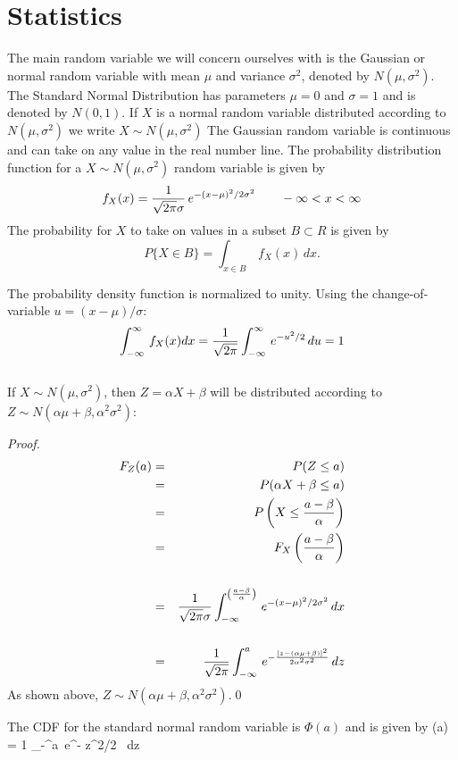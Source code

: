 \section{Statistics}

The main random variable we will concern ourselves with is the Gaussian or normal random variable with mean $\mu$ and variance $\sigma^2$, denoted by $N(\mu, \sigma^2)$. 
The Standard Normal Distribution has parameters $\mu =0$ and $\sigma = 1$ and is denoted by $N(0,1)$. If $X$ is a normal random variable distributed according to $N(\mu,\sigma^2)$ we write 
$X \sim N(\mu, \sigma^2)$
The Gaussian random variable is continuous and can take on any value in the real number line. The probability distribution function for a $X \sim N(\mu,\sigma^2)$ random variable is given by 
$$f_X(x) = {1\over \sqrt{2\pi}\sigma}\, e^{-(x-\mu)^2/2\sigma^2} \quad\quad -\infty < x < \infty$$
The probability for $X$ to take on values in a subset $B \subset R$ is given by $$P\{X \in B\} = \int_{x \in B}\, f_X(x)\, dx.$$

The probability density function is normalized to unity. Using the change-of-variable $u = (x-\mu)/\sigma$: 
\begin{equation}
\int_{-\infty}^{\infty} \, f_X(x) dx = {1\over \sqrt{2\pi}} \int_{-\infty}^{\infty}\, e^{-u^2/2}\, du = 1
\label{eqn:gaussnormalization} \end{equation}\\

If $X \sim N(\mu, \sigma^2)$, then $Z = \alpha X + \beta$ will be distributed according to $Z \sim N(\alpha\mu + \beta, \alpha^2\sigma^2)$: 
\begin{proof}
\begin{eqnarray*}\large
F_Z(a)    &=& P(Z\le a)\\
               &=& P(\alpha X + \beta \le a) \\
               &=& P\left(X \le {a - \beta\over \alpha}\right) \\
               &=& F_X\left({a - \beta\over \alpha}\right) \\ \\
               &=& {1\over \sqrt{2\pi}\sigma} \int_{-\infty}^{\left({a-\beta\over \alpha}\right)} \, e^{-(x-\mu)^2/2\sigma^2}\, dx\\ \\
               &=& {1\over \sqrt{2\pi}} \int_{-\infty}^{a}\, e^{-{ [z - (\alpha\mu + \beta) ]^2\over2\alpha^2\sigma^2} } \, dz
\end{eqnarray*}
As shown above, $Z \sim N(\alpha\mu + \beta, \alpha^2\sigma^2)$.\qed
\end{proof}

The CDF for the standard normal random variable is $\Phi(a)$ and is given by 
\be \Phi(a) = {1\over \sqrt{2\pi}} \int_{-\infty}^{a}\, e^{-{ z^2/2} } \, dz \label{eqn:Phi}\ee

